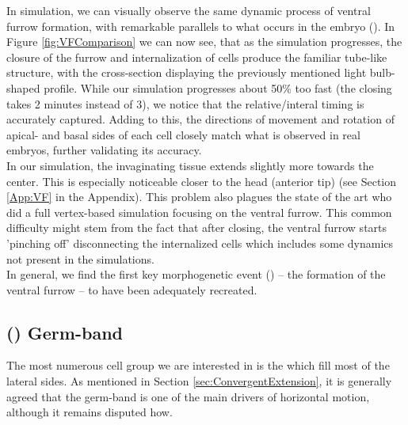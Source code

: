 In simulation, we can visually observe the same dynamic process of ventral furrow formation, with remarkable parallels to what occurs in the embryo (). In Figure \ref{fig:VFComparison} we can now see, that as the simulation progresses, the closure of the furrow and internalization of cells produce the familiar tube-like structure, with the cross-section displaying the previously mentioned light bulb-shaped profile. While our simulation progresses about 50\% too fast (the closing takes 2 minutes instead of 3), we notice that the relative/interal timing is accurately captured. Adding to this, the directions of movement and rotation of apical- and basal sides of each cell closely match what is observed in real embryos, further validating its accuracy. \\

In our simulation, the invaginating tissue extends slightly more towards the center. This is especially noticeable closer to the head (anterior tip) (see Section \ref{App:VF} in the Appendix). This problem also plagues the state of the art  who did a full vertex-based simulation focusing on the ventral furrow. This common difficulty might stem from the fact that after closing, the ventral furrow starts 'pinching off' disconnecting the internalized cells which includes some dynamics not present in the simulations.\cite{supatto2008quantitative}\\
In general, we find the first key morphogenetic event () -- the formation of the ventral furrow --  to have been adequately recreated.

\subsection{() Germ-band}
The most numerous cell group we are interested in is the  which fill most of the lateral sides. As mentioned in Section \ref{sec:ConvergentExtension}, it is generally agreed that the germ-band is one of the main drivers of horizontal motion, although it remains disputed how.

